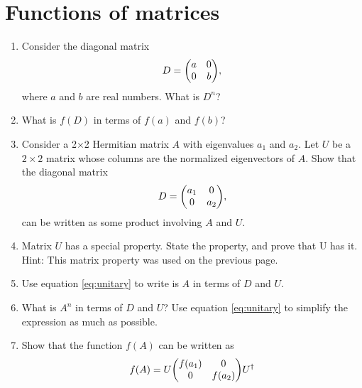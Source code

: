 \documentclass{article}
\begin{document}
\section{Functions of matrices}
  \begin{enumerate}[label=(\alph*)]
      \item\label{it:D} Consider the diagonal matrix
      \begin{equation}
      D = \mqty(a&0\\0&b),
      \end{equation}
      where $a$ and $b$ are real numbers.  What is $D^n$?
      \vspace{1.5cm}
      \item What is $f(D)$ in terms of $f(a)$ and $f(b)$?
      \vspace{2cm}
      \item Consider a 2$\times$2 Hermitian matrix $A$ with eigenvalues $a_1$ and $a_2$. Let $U$ be a $2\times2$ matrix whose columns are the normalized eigenvectors of $A$.  Show that the diagonal matrix
      \begin{equation}
      D = \mqty(a_1&0\\0&a_2),
      \end{equation}
      can be written as some product involving $A$ and $U$.
      \vspace{2cm}
      \item Matrix $U$ has a special property.  State the property, and prove that U has it. Hint: This matrix property was used on the previous page.
      \vspace{2cm}
      \item Use equation \ref{eq:unitary} to write is $A$ in terms of $D$ and $U$.
      \vspace{2cm}
      \item What is $A^n$ in terms of $D$ and $U$? Use equation \ref{eq:unitary} to simplify the expression as much as possible.
      \vspace{2cm}
      \item\label{it:f(A)} Show that the function $f(A)$ can be written as
      \begin{equation}
      f(A)
      = U
      \mqty(f(a_1) &0\\0 &f(a_2))
      U^\dagger
      \end{equation}
    \end{enumerate}
\newpage
\end{document}
